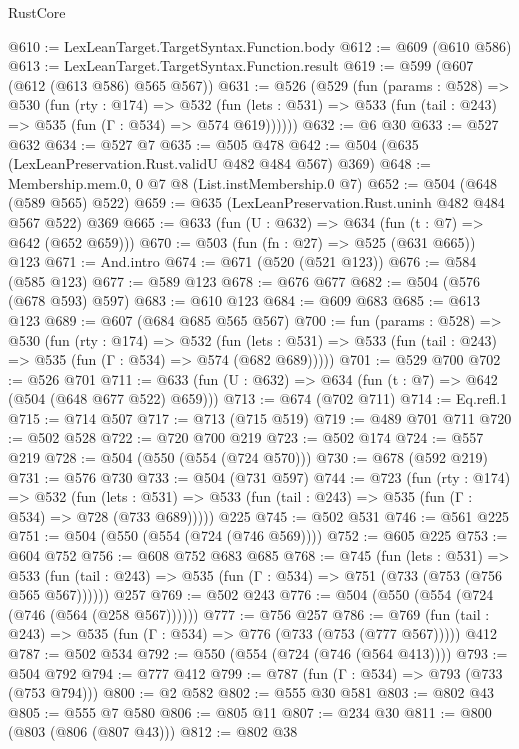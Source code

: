 \begin{lexlean}{RustCore}
\begin{coremodule}
@610 := LexLeanTarget.TargetSyntax.Function.body
@612 := @609 (@610 @586)
@613 := LexLeanTarget.TargetSyntax.Function.result
@619 := @599 (@607 (@612 (@613 @586) @565 @567))
@631 := @526
    (@529
      (fun (params : @528) =>
      @530
        (fun (rty : @174) =>
        @532
          (fun (lets : @531) => @533 (fun (tail : @243) => @535 (fun (Γ : @534) => @574 @619))))))
@632 := @6 @30
@633 := @527 @632
@634 := @527 @7
@635 := @505 @478
@642 := @504 (@635 (LexLeanPreservation.Rust.validU @482 @484 @567) @369)
@648 := Membership.mem.{0, 0} @7 @8 (List.instMembership.{0} @7)
@652 := @504 (@648 (@589 @565) @522)
@659 := @635 (LexLeanPreservation.Rust.uninh @482 @484 @567 @522) @369
@665 := @633 (fun (U : @632) => @634 (fun (t : @7) => @642 (@652 @659)))
@670 := @503 (fun (fn : @27) => @525 (@631 @665)) @123
@671 := And.intro
@674 := @671 (@520 (@521 @123))
@676 := @584 (@585 @123)
@677 := @589 @123
@678 := @676 @677
@682 := @504 (@576 (@678 @593) @597)
@683 := @610 @123
@684 := @609 @683
@685 := @613 @123
@689 := @607 (@684 @685 @565 @567)
@700 := fun (params : @528) =>
  @530
    (fun (rty : @174) =>
    @532
      (fun (lets : @531) => @533 (fun (tail : @243) => @535 (fun (Γ : @534) => @574 (@682 @689)))))
@701 := @529 @700
@702 := @526 @701
@711 := @633 (fun (U : @632) => @634 (fun (t : @7) => @642 (@504 (@648 @677 @522) @659)))
@713 := @674 (@702 @711)
@714 := Eq.refl.{1}
@715 := @714 @507
@717 := @713 (@715 @519)
@719 := @489 @701 @711
@720 := @502 @528
@722 := @720 @700 @219
@723 := @502 @174
@724 := @557 @219
@728 := @504 (@550 (@554 (@724 @570)))
@730 := @678 (@592 @219)
@731 := @576 @730
@733 := @504 (@731 @597)
@744 := @723
    (fun (rty : @174) =>
    @532
      (fun (lets : @531) => @533 (fun (tail : @243) => @535 (fun (Γ : @534) => @728 (@733 @689)))))
    @225
@745 := @502 @531
@746 := @561 @225
@751 := @504 (@550 (@554 (@724 (@746 @569))))
@752 := @605 @225
@753 := @604 @752
@756 := @608 @752 @683 @685
@768 := @745
    (fun (lets : @531) =>
    @533 (fun (tail : @243) => @535 (fun (Γ : @534) => @751 (@733 (@753 (@756 @565 @567))))))
    @257
@769 := @502 @243
@776 := @504 (@550 (@554 (@724 (@746 (@564 (@258 @567))))))
@777 := @756 @257
@786 := @769 (fun (tail : @243) => @535 (fun (Γ : @534) => @776 (@733 (@753 (@777 @567))))) @412
@787 := @502 @534
@792 := @550 (@554 (@724 (@746 (@564 @413))))
@793 := @504 @792
@794 := @777 @412
@799 := @787 (fun (Γ : @534) => @793 (@733 (@753 @794)))
@800 := @2 @582
@802 := @555 @30 @581
@803 := @802 @43
@805 := @555 @7 @580
@806 := @805 @11
@807 := @234 @30
@811 := @800 (@803 (@806 (@807 @43)))
@812 := @802 @38

\end{coremodule}
\end{lexlean}
